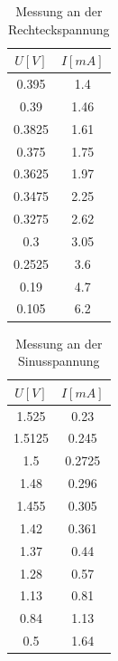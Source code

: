 \documentclass[11pt]{article}
\begin{document}
 
 \begin{table}[h]
 \centering
 \caption{Messung an der Rechteckspannung}
 \begin{tabular}{|c|c|}
  \hline
  $U[V]$ & $I[mA]$  \\
  \hline
  0.395 & 1.4 \\
  0.39 & 1.46 \\
  0.3825& 1.61 \\
  0.375 & 1.75 \\
  0.3625 & 1.97\\
  0.3475 & 2.25\\
  0.3275 & 2.62 \\
  0.3 & 3.05\\
  0.2525 & 3.6\\
  0.19 & 4.7\\
  0.105 & 6.2\\
  \hline
 \end{tabular}
 \label{Messung 3}
 \end{table}
 
 
 \begin{table}[h]
 \centering
 \caption{Messung an der Sinusspannung}
 \begin{tabular}{|c|c|}
  \hline
  $U[V]$ & $I[mA]$  \\
  \hline
  1.525 & 0.23 \\
  1.5125 & 0.245 \\
  1.5& 0.2725 \\
  1.48 & 0.296 \\
  1.455 & 0.305\\
  1.42& 0.361\\
  1.37 & 0.44 \\
  1.28 & 0.57\\
  1.13 & 0.81\\
  0.84 & 1.13\\
  0.5 & 1.64\\
  \hline
 \end{tabular}
 \label{Messung 4}
 \end{table}
\end{document}
